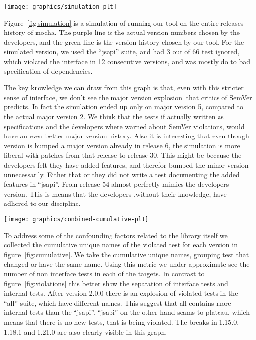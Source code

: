 \begin{figure*}
\centering
\texttt{[image: graphics/simulation-plt]}
\caption{Simulation of version histories}%
\label{fig:simulation}
\end{figure*}

Figure~\ref{fig:simulation} is a simulation of running our tool 
on the entire releases history of mocha. The purple line is the 
actual version numbers chosen by the developers, and the green line is the
version history chosen by our tool.  For the simulated version, we used the
``jsapi'' suite, and had 3 out of 66 test ignored,
which violated the interface in 12 consecutive versions, and was mostly do to
bad specification of dependencies. 

The key knowledge we can draw from this graph is that, even with this stricter
sense of interface, we don't see the major version explosion, that critics of
SemVer predicts. In fact the simulation ended up only on major version 5,
compared to the actual major version 2. We think that the tests if actually
written as specifications and the developers where warned about SemVer
violations, would have an even better major version history.
Also it is interesting that even though version is bumped a major version
already in release 6, the simulation is more liberal with patches from that 
release to release 30. This might be because the developers felt they have added 
features, and therefor bumped the minor version unnecessarily. Either that
or they did not write a test documenting the added features in ``jsapi''. From 
release 54 almost perfectly mimics the developers version. This is means that the
developers ,without their knowledge, have adhered to our discipline. 

\begin{figure*}
\centering
\texttt{[image: graphics/combined-cumulative-plt]}
\caption{Cumulative names of violated tests} 
\label{fig:cumulative}
\end{figure*}

To address some of the confounding factors related to the library itself we
collected the cumulative unique names of the violated test for each version in
figure~\ref{fig:cumulative}. We take the cumulative unique names, grouping test
that changed or have the same name. Using this metric we under approximate see
the number of non interface tests in each of the targets. In contrast to
figure~\ref{fig:violations} this better show the separation of interface tests
and internal tests. After version 2.0.0 there is an explosion of violated tests
in the ``all'' suite, which have different names. This suggest that all
contains more internal tests than the ``jsapi''. ``jsapi'' on the other hand
seams to plateau, which means that there is no new tests, that is being
violated. The breaks in 1.15.0, 1.18.1 and 1.21.0 are also clearly visible in
this graph. 

